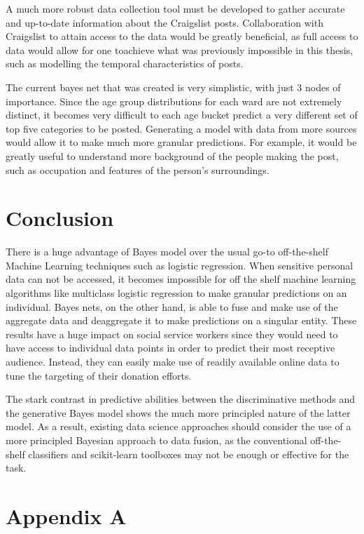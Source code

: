 \documentclass[12pt]{article}
\begin{document}
A much more robust data collection tool must be developed to gather accurate and up-to-date information about the Craigslist posts. Collaboration with Craigslist to attain access to the data would be greatly beneficial, as full access to data would allow for one toachieve what was previously impossible in this thesis, such as modelling the temporal characteristics of posts. 

The current bayes net that was created is very simplistic, with just 3 nodes of importance. Since the age group distributions for each ward are not extremely distinct, it becomes very difficult to each age bucket predict a very different set of top five categories to be posted. Generating a model with data from more sources would allow it to make much more granular predictions. For example, it would be greatly useful to understand more background of the people making the post, such as occupation and features of the person's surroundings. 

\newpage
\section{Conclusion}
There is a huge advantage of Bayes model over the usual go-to off-the-shelf Machine Learning techniques such as logistic regression. When sensitive personal data can not be accessed, it becomes impossible for off the shelf machine learning algorithms like multiclass logistic regression to make granular predictions on an individual. Bayes nets, on the other hand, is able to fuse and make use of the aggregate data and deaggregate it to make predictions on a singular entity. These results have a huge impact on social service workers since they would need to have access to individual data points in order to predict their most receptive audience. Instead, they can easily make use of readily available online data to tune the targeting of their donation efforts. 

The stark contrast in predictive abilities between the discriminative methods and the generative Bayes model shows the much more principled nature of the latter model. As a result, existing data science approaches should consider the use of a more principled Bayesian approach to data fusion, as the conventional off-the-shelf classifiers and scikit-learn toolboxes may not be enough or effective for the task. 

\newpage
\printbibliography

\newpage
\section{Appendix A}
\end{document}
